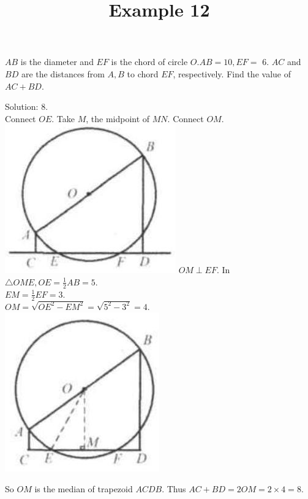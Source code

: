 \documentclass{article}
\title{Example 12}
\date{}
\begin{document}
\maketitle

\(A B\) is the diameter and \(E F\) is the chord of circle \(O . A B=10, E F=\) 6. \(A C\) and \(B D\) are the distances from \(A, B\) to chord \(E F\), respectively. Find the value of \(A C+B D\).

Solution: 8.\\
Connect \(O E\). Take \(M\), the midpoint of \(M N\). Connect \(O M\).\\
\includegraphics[width=\textwidth]{images/problem_image_1.jpg} \(O M \perp E F\). In \(\triangle O M E, O E=\frac{1}{2} A B=5\).\\
\(E M=\frac{1}{2} E F=3\).\\
\(O M=\sqrt{O E^{2}-E M^{2}}=\sqrt{5^{2}-3^{2}}=4\).\\
\centering
\includegraphics[width=\textwidth]{images/reasoning_image_1.jpg}

So \(O M\) is the median of trapezoid \(A C D B\). Thus \(A C+B D=2 O M=2 \times 4=8\).\\
\end{document}

